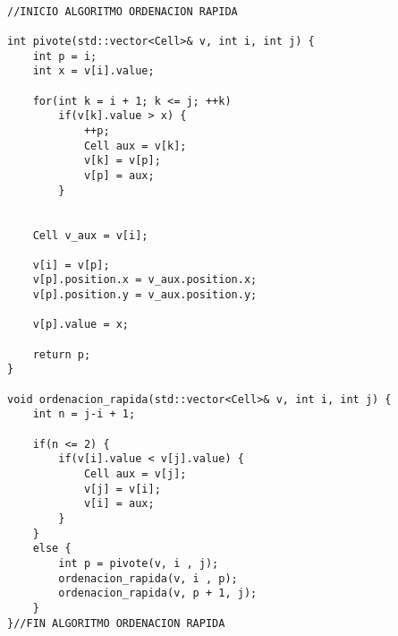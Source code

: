 \begin{lstlisting}

//INICIO ALGORITMO ORDENACION RAPIDA

int pivote(std::vector<Cell>& v, int i, int j) {
    int p = i;
    int x = v[i].value;

    for(int k = i + 1; k <= j; ++k)
        if(v[k].value > x) {
            ++p;
            Cell aux = v[k];
            v[k] = v[p];
            v[p] = aux;
        }
     

    Cell v_aux = v[i];

    v[i] = v[p];
	v[p].position.x = v_aux.position.x;
	v[p].position.y = v_aux.position.y;
   
    v[p].value = x;

    return p;
}

void ordenacion_rapida(std::vector<Cell>& v, int i, int j) {
    int n = j-i + 1;

    if(n <= 2) {
        if(v[i].value < v[j].value) {
            Cell aux = v[j];
            v[j] = v[i];
            v[i] = aux;
        }
    }
    else {
        int p = pivote(v, i , j);
        ordenacion_rapida(v, i , p);
        ordenacion_rapida(v, p + 1, j);
    }
}//FIN ALGORITMO ORDENACION RAPIDA



\end{lstlisting}
